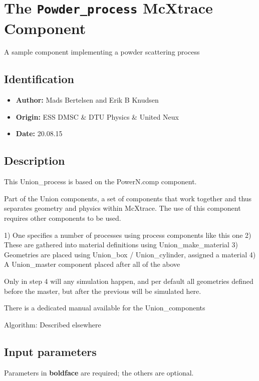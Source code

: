 \section{The \texttt{Powder\_process} McXtrace Component}
A sample component implementing a powder scattering process

\subsection*{Identification}
\begin{itemize}
  \item \textbf{Author:} Mads Bertelsen and Erik B Knudsen
  \item \textbf{Origin:} ESS DMSC \& DTU Physics \& United Neux
  \item \textbf{Date:} 20.08.15
\end{itemize}

\subsection*{Description}
This Union\_process is based on the PowerN.comp component.

Part of the Union components, a set of components that work together and thus separates geometry and physics within McXtrace. The use of this component requires other components to be used.

1) One specifies a number of processes using process components like this one 2) These are gathered into material definitions using Union\_make\_material 3) Geometries are placed using Union\_box / Union\_cylinder, assigned a material 4) A Union\_master component placed after all of the above

Only in step 4 will any simulation happen, and per default all geometries defined before the master, but after the previous will be simulated here.

There is a dedicated manual available for the Union\_components

Algorithm: Described elsewhere

\subsection*{Input parameters}
Parameters in \textbf{boldface} are required; the others are optional.

